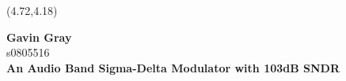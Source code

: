 \begin{titlepage}


\begin{textblock}{6.85}(4.72,4.18)
\begin{center}
{\doublespacing
{\bfseries
Gavin Gray
} \\
{\small s0805516 \\
{\bfseries \large \sffamily
An Audio Band Sigma-Delta Modulator with 103dB SNDR
} \\
}
}
\end{center}
\end{textblock}

\newpage
\thispagestyle{empty}
\mbox{}


\end{titlepage}
